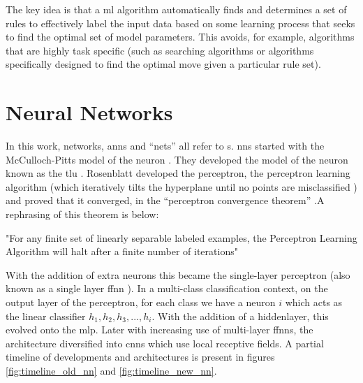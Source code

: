 The key idea is that a \gls{ml} algorithm automatically finds and determines a set of rules to effectively label the input data based on some learning process that seeks to find the optimal set of model parameters. This avoids, for example, algorithms that are highly task specific (such as searching algorithms or algorithms specifically designed to find the optimal move given a particular rule set). 
\bigskip

\section{Neural Networks} 

In this work, networks, \gls{ann}s and \enquote{nets} all refer to s. \gls{nn}s started with the McCulloch-Pitts model of the neuron \cite{logical_calculus}. They developed the model of the neuron known as the \gls{tlu} \cite[Chapter~2]{neural_book_rojas}. Rosenblatt developed the perceptron, the perceptron learning algorithm (which iteratively tilts the hyperplane until no points are misclassified \cite{perceptron_learning_intuition}) \cite{perceptron_paper} and proved that it converged, in the \enquote{perceptron convergence theorem} \cite{perceptron_convergence_rosenblatt}.A rephrasing of this theorem is below:

\begin{theorem}
"For any finite set of linearly separable labeled examples, the Perceptron Learning Algorithm will halt after a finite number of iterations" \cite{perceptron_convergence_theorem}
\end{theorem}

With the addition of extra neurons this became the single-layer perceptron (also known as a single layer \gls{ffnn} \cite{haykin}). In a multi-class classification context, on the output layer of the perceptron, for each class we have a neuron $i$ which acts as the linear classifier $h_1, h_2, h_3, ... , h_i$. With the addition of a \gls{hiddenlayer}, this evolved onto the \gls{mlp}. Later with increasing use of multi-layer \gls{ffnn}s, the architecture diversified into \gls{cnn}s which use local receptive fields. A partial timeline of developments and architectures is present in figures \ref{fig:timeline_old_nn} and \ref{fig:timeline_new_nn}. \bigskip

